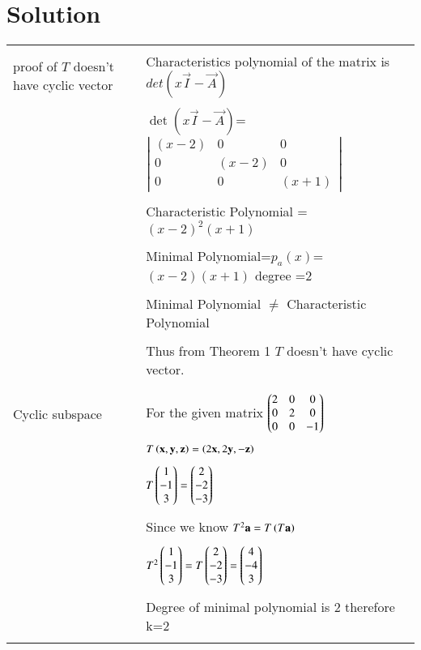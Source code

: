 \documentclass[journal,12pt]{IEEEtran}
\begin{document}
\section{\textbf{Solution}}
\renewcommand{\thetable}{2}
\begin{longtable}{|l|l|}
\hline

\multirow{3}{*}{proof of $T$ doesn't have cyclic vector } & \\
&
Characteristics polynomial of the matrix  is $det(x\vec{I}-\vec{A})$\\ 
&\\
& $\det(x\vec{I}-\vec{A})$= $\left|
                \begin{array}{ccc}
                (x-2) & 0 & 0\\
                0 & (x-2) & 0\\
                0 & 0 & (x+1)
                \end{array} \right|$  \\
&\\
& Characteristic Polynomial = $(x-2)^2(x+1)$\\
&\\
& Minimal Polynomial=$p_a(x)$=$(x-2)(x+1)$  degree =2   \\
&\\
&Minimal Polynomial $\neq$ Characteristic Polynomial \\
&\\
&Thus from Theorem 1 $T$ doesn't have cyclic vector.\\  
&\\
\hline
\multirow{3}{*}{Cyclic subspace} & \\

&For the given matrix  $\begin{pmatrix}2&0&0\\0&2&0\\0&0&-1\end{pmatrix}$\\
&\\
&$T\left(\mathbf{x},\mathbf{y},\mathbf{z}\right)=\left(2\mathbf{x},2\mathbf{y},-\mathbf{z}\right)$\\
&\\
&$T\begin{pmatrix}1\\-1\\3\end{pmatrix}=\begin{pmatrix}2\\-2\\-3\end{pmatrix}$\\
&\\
&Since we know $T^2\mathbf{a}=T\left(T\mathbf{a}\right)$\\
&\\
&$T^2\begin{pmatrix}1\\-1\\3\end{pmatrix}=T\begin{pmatrix}2\\-2\\-3\end{pmatrix}=\begin{pmatrix}4\\-4\\3\end{pmatrix}$\\
&\\
&Degree of minimal polynomial is 2 therefore k=2\\
&\\


\end{longtable}
\end{document}
